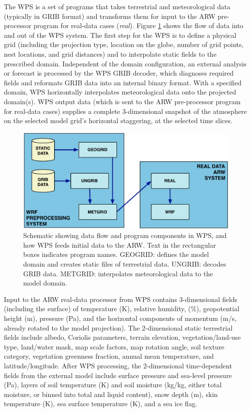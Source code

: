The WPS is a set of programs that takes
terrestrial and meteorological data (typically in GRIB format) and transforms them for input to
the ARW pre-processor program for real-data cases ({\it real}).
Figure \ref {figure:WPS_real_wrf} shows the flow of data into and out of the WPS system.  
The first step for the WPS is to define a physical grid (including
the projection type, location on the globe, 
number of grid points, nest locations, and grid distances) and
to interpolate static fields to the prescribed domain.
Independent of the domain configuration,
an external analysis or forecast is processed by the WPS GRIB decoder,
which diagnoses required fields and
reformats GRIB data into an internal binary format.
With a specified domain,
WPS horizontally interpolates meteorological data onto the projected domain(s). 
WPS output data (which is sent to the ARW pre-processor program for real-data cases) 
supplies a complete 3-dimensional snapshot of the atmosphere
on the selected model grid's horizontal staggering, at the selected time slices.

%
%
\begin{figure}
  \centering
  \includegraphics[width=6in]{figures/WPS_real_wrf.pdf}
  \caption{\label{figure:WPS_real_wrf}Schematic showing 
data flow and program components in WPS, and how WPS feeds initial data to the ARW.
Text in the rectangular boxes indicates program names.
GEOGRID: defines the model domain and creates static files of terrestrial data.  UNGRIB:
decodes GRIB data. METGRID: interpolates meteorological data to the model domain.}
\end{figure}

Input to the ARW real-data processor from 
WPS contains 3-dimensional fields (including
the surface) of temperature (K), relative humidity,
(\%), geopotential height (m), pressure (Pa), 
and the horizontal components of momentum (m/s, already rotated to the model 
projection).  
The 2-dimensional static terrestrial fields include
albedo, Coriolis parameters, terrain elevation, vegetation/land-use type, 
land/water mask, map scale factors, map rotation angle, soil texture category, vegetation greenness fraction, 
annual mean temperature, 
and latitude/longitude.  
After WPS processing, the 2-dimensional time-dependent fields from the external model include 
surface pressure and sea-level pressure (Pa), layers of soil temperature (K) and  soil moisture (kg/kg, 
either total moisture, or 
binned into total and liquid content), 
snow depth (m), skin temperature (K), sea surface temperature (K), and a sea ice flag.  

